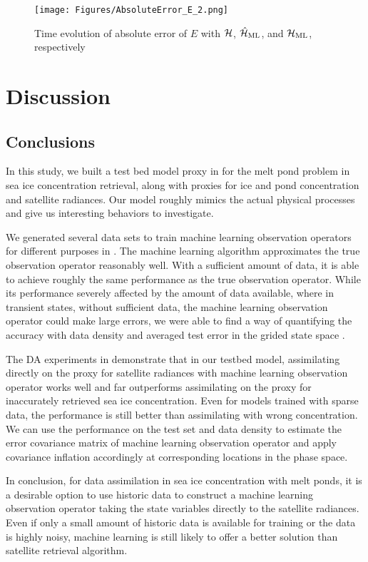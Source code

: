 \begin{figure}\label{fig:error_E_2}
\centering
\texttt{[image: Figures/AbsoluteError\_E\_2.png]}
\caption{Time evolution of absolute error of $E$ with $\mathcal{H}$, $\hat{\mathcal{H}}_{\text{ML}}$, and $\mathcal{H}_{\text{ML}}$, respectively}
\end{figure}

\chapter{Discussion}
\section{Conclusions}
\par In this study, we built a test bed model proxy in  for the melt pond problem in sea ice concentration retrieval, along with proxies for ice and pond concentration and satellite radiances. Our model roughly mimics the actual physical processes and give us interesting behaviors to investigate.

\par We generated several data sets to train machine learning observation operators for different purposes in . The machine learning algorithm approximates the true observation operator reasonably well. With a sufficient amount of data, it is able to achieve roughly the same performance as the true observation operator. While its performance severely affected by the amount of data available, where in transient states, without sufficient data, the machine learning observation operator could make large errors, we were able to find a way of quantifying the accuracy with data density and averaged test error in the grided state space .

\par The DA experiments in  demonstrate that in our testbed model, assimilating directly on the proxy for satellite radiances with machine learning observation operator works well and far outperforms assimilating on the proxy for inaccurately retrieved sea ice concentration. Even for models trained with sparse data, the performance is still better than assimilating with wrong concentration. We can use the performance on the test set and data density to estimate the error covariance matrix of machine learning observation operator and apply covariance inflation accordingly at corresponding locations in the phase space. 

\par In conclusion, for data assimilation in sea ice concentration with melt ponds, it is a desirable option to use historic data to construct a machine learning observation operator taking the state variables directly to the satellite radiances. Even if only a small amount of historic data is available for training or the data is highly noisy, machine learning is still likely to offer a better solution than satellite retrieval algorithm.

